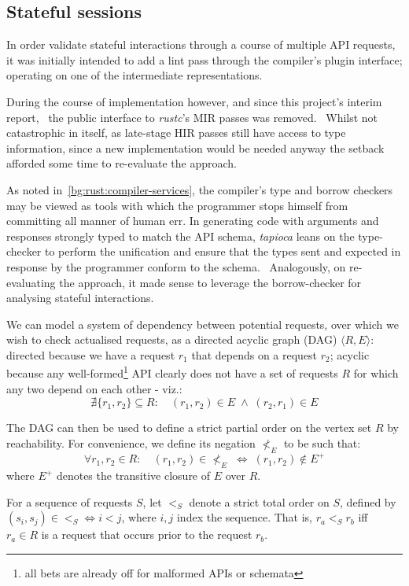 \subsection{Stateful sessions} \label{impl:sessions}

In order validate stateful interactions through a course of multiple API requests, it was initially intended to add a lint pass through the compiler's plugin interface; operating on one of the intermediate representations.~~\cite{interim}

During the course of implementation however, and since this project's interim report,~\cite{interim} the public interface to \emph{rustc}'s MIR passes was removed.~\cite{rust_pr40239} Whilst not catastrophic in itself, as late-stage HIR passes still have access to type information, since a new implementation would be needed anyway the setback afforded some time to re-evaluate the approach.

As noted in~\cref{bg:rust:compiler-services}, the compiler's type and borrow checkers may be viewed as tools with which the programmer stops himself from committing all manner of human err. In generating code with arguments and responses strongly typed to match the API schema, \emph{tapioca} leans on the type-checker to perform the unification and ensure that the types sent and expected in response by the programmer conform to the schema.~ Analogously, on re-evaluating the approach, it made sense to leverage the borrow-checker for analysing stateful interactions.

We can model a system of dependency between potential requests, over which we wish to check actualised requests, as a directed acyclic graph (DAG) $\langle{R,E}\rangle$: directed because we have a request $r_1$ that depends on a request $r_2$; acyclic because any well-formed\footnote{all bets are already off for malformed APIs or schemata} API clearly does not have a set of requests $R$ for which any two depend on each other - viz.:\[
\nexists{\{r_1,r_2\}\subseteq{R}}\colon\quad
(r_1, r_2)\in{E} \;\wedge\; (r_2, r_1)\in{E}
\]

The DAG can then be used to define a strict partial order on the vertex set $R$ by reachability. For convenience, we define its negation $\nless_{E}$ to be such that:\[
\forall{r_1,r_2\in{R}}\colon\quad
(r_1, r_2)\in{\nless_{E}} \;\iff\; (r_1, r_2)\notin{E^{+}}
\] where $E^{+}$ denotes the transitive closure of $E$ over $R$.

For a sequence of requests $S$, let $<_{S}$ denote a strict total order on $S$, defined by $(s_i, s_j)\in{<_{S}} \iff i<j$, where $i,j$ index the sequence. That is, $r_a <_{S} r_b$ iff $r_a\in{R}$ is a request that occurs prior to the request $r_b$.

